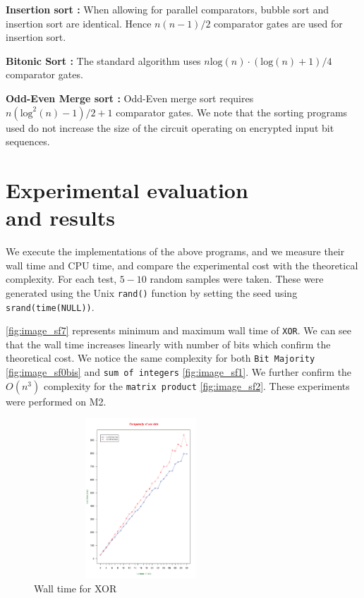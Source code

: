 \documentclass{acm_proc_article-sp}
\begin{document}
\textbf{Insertion sort :} When allowing for parallel comparators, bubble sort and insertion sort are identical. Hence $n(n-1)/2$ comparator gates are used for insertion sort.

\textbf{Bitonic Sort :} The standard algorithm uses $n\mathrm{log}(n)·(\mathrm{log}(n)+1)/4$ comparator gates. 

\textbf{Odd-Even Merge sort :} Odd-Even merge sort requires  $n(\mathrm{log}^{2}(n)-1)/2 + 1 $ comparator gates.
We note that the sorting programs used do not increase the size of the circuit operating on encrypted input bit sequences. 

\section{Experimental evaluation \\ and results}
\label{Sec:Eval}
We execute the implementations of the above programs, and we measure their wall time and CPU time, and compare the experimental cost with the theoretical complexity. For each test, $5-10$ random samples were taken. These were generated using the Unix \texttt{rand()} function by setting the seed using \texttt{srand(time(NULL))}.  

 \autoref{fig:image_sf7} represents minimum and maximum wall time of \texttt{XOR}. We can see that the wall time increases linearly with number of bits which confirm the theoretical cost. We notice the same complexity for both \texttt{Bit Majority} \autoref{fig:image_sf0bis} and \texttt{sum of integers} \autoref{fig:image_sf1}. We further confirm the $O(n^{3})$ complexity for the \texttt{matrix product} \autoref{fig:image_sf2}. These experiments were performed on M2.


\begin{figure}[!H]%
\centering
\includegraphics[width=8cm, height=6cm]{f4.pdf} 
\caption{Wall time for XOR} 
\label{fig:image_sf0} %
\end{figure}
\end{document}
